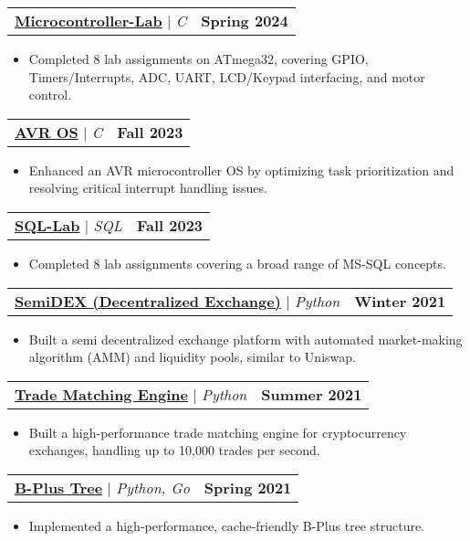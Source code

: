\documentclass[letterpaper,11pt]{article}
\makeatletter
\newcommand{\resumeItem}[1]{
  \item\small{
    {#1 \vspace{-2pt}}
  }
}
\newcommand{\resumeProjectHeading}[2]{
    \item
    \begin{tabular*}{1.001\textwidth}{l@{\extracolsep{\fill}}r}
      \small#1 & \textbf{\small #2}\\
    \end{tabular*}\vspace{-7pt}
}
\newcommand{\resumeItemListStart}{\begin{itemize}}
\newcommand{\resumeItemListEnd}{\end{itemize}\vspace{-5pt}}
\makeatother
\begin{document}
      \vspace{-11pt}
    \resumeProjectHeading
      {\href{https://github.com/MohammadmahdiAhmadi/Microcontroller-Lab}{\color{blue}\textbf{Microcontroller-Lab}} $|$ \emph{C}}{Spring 2024}
      \resumeItemListStart
        \vspace{1mm}
        \resumeItem{Completed 8 lab assignments on ATmega32, covering GPIO, Timers/Interrupts, ADC, UART, LCD/Keypad interfacing, and motor control.}
      \resumeItemListEnd

    \vspace{-11pt}
    \resumeProjectHeading
      {\href{https://github.com/MohammadmahdiAhmadi/AVR-OS}{\color{blue}\textbf{AVR OS}} $|$ \emph{C}}{Fall 2023}
      \resumeItemListStart
        \vspace{1mm}
        \resumeItem{Enhanced an AVR microcontroller OS by optimizing task prioritization and resolving critical interrupt handling issues.}
      \resumeItemListEnd

    \vspace{-11pt}
    \resumeProjectHeading
      {\href{https://github.com/MohammadmahdiAhmadi/SQL-Lab}{\color{blue}\textbf{SQL-Lab}} $|$ \emph{SQL}}{Fall 2023}
      \resumeItemListStart
        \vspace{1mm}
        \resumeItem{Completed 8 lab assignments covering a broad range of MS-SQL concepts.}
      \resumeItemListEnd

    \vspace{-11pt}
    \resumeProjectHeading
      {\href{https://github.com/MohammadmahdiAhmadi/SemiDEX}{\color{blue}\textbf{SemiDEX (Decentralized Exchange)}} $|$ \emph{Python}}{Winter 2021}
      \resumeItemListStart
        \vspace{1mm}
        \resumeItem{Built a semi decentralized exchange platform with automated market-making algorithm (AMM) and liquidity pools, similar to Uniswap.}
      \resumeItemListEnd
	
	\vspace{-11pt}
    \resumeProjectHeading
      {\href{}{\textbf{Trade Matching Engine}} $|$ \emph{Python}}{Summer 2021}
      \resumeItemListStart
        \vspace{1mm}
        \resumeItem{Built a high-performance trade matching engine for cryptocurrency exchanges, handling up to 10,000 trades per second.}
      \resumeItemListEnd

    \vspace{-11pt}
    \resumeProjectHeading
      {\href{}{\textbf{B-Plus Tree}} $|$ \emph{Python, Go}}{Spring 2021}
      \resumeItemListStart
        \vspace{1mm}
        \resumeItem{Implemented a high-performance, cache-friendly B-Plus tree structure.}
      \resumeItemListEnd
      
\end{document}
